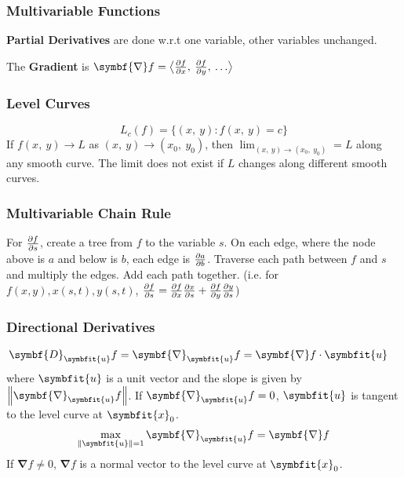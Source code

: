 \documentclass{article}
\begin{document}
\begin{multicols}{3}
    \subsubsection*{Multivariable Functions}
    \textbf{Partial Derivatives} are done w.r.t one variable, other variables unchanged.

    The \textbf{Gradient} is $\symbf{\nabla}f = \avec[\big]{\pdv{f}{x},\: \pdv{f}{y},\: \dots}$
    \subsubsection*{Level Curves}
    \begin{equation*}
        L_c\left( f \right) = \bigl\{ \left( x,\: y \right) : f\left(x,\: y\right) = c\bigr\}
    \end{equation*}
    If $f(x,\: y) \to L$ as $(x,\: y) \to (x_0,\: y_0)$, then
    $\displaystyle \lim_{(x,\: y) \to (x_0,\: y_0)} = L$ along any smooth
    curve. The limit does not exist if $L$ changes along different smooth curves.

    \subsubsection*{Multivariable Chain Rule}
    For $\pdv{f}{s}$, create a tree from $f$ to the variable $s$.
    On each edge, where the node above is $a$ and below is $b$, each edge is $\pdv{a}{b}$.
    Traverse each path between $f$ and $s$ and multiply the edges.
    Add each path together.
    (i.e. for $f(x, y), x(s,t), y(s,t)$, $\pdv{f}{s} = \pdv{f}{x}\pdv{x}{s}+\pdv{f}{y}\pdv{y}{s}$)
    \subsubsection*{Directional Derivatives}
    \begin{align*}
        \symbf{D}_{\symbfit{u}}f = \symbf{\nabla}_{\symbfit{u}}f
         & = \symbf{\nabla}f \cdot \symbfit{u}
    \end{align*}
    where $\symbfit{u}$ is a unit vector and the slope is given by $\norm{\symbf{\nabla}_{\symbfit{u}}f}$.
    If $\symbf{\nabla}_{\symbfit{u}}f=0$, $\symbfit{u}$ is tangent to the level curve at $\symbfit{x}_0$.
    \begin{align*}
        \max_{\norm{\symbfit{u}} = 1} \symbf{\nabla}_{\symbfit{u}}f = \symbf{\nabla}f
    \end{align*}
    If $\symbf{\nabla}f\neq 0$, $\symbf{\nabla}f$ is a normal vector to the level curve at $\symbfit{x}_0$.

\end{multicols}
\end{document}
